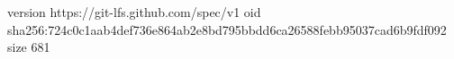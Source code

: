 version https://git-lfs.github.com/spec/v1
oid sha256:724c0c1aab4def736e864ab2e8bd795bbdd6ca26588febb95037cad6b9fdf092
size 681
